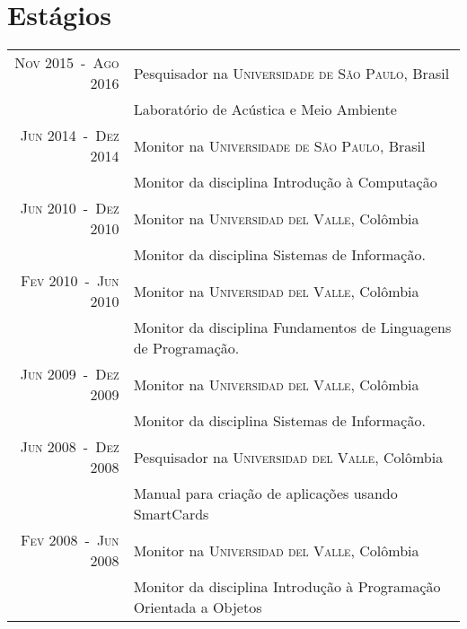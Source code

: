 \documentclass[a4paper,10pt]{article}
\begin{document}
\section{Estágios}
\begin{longtable}{rl}

    \textsc{Nov 2015~-~Ago 2016}  & Pesquisador na \textsc{Universidade de São Paulo}, Brasil \\
                                  &\footnotesize{Laboratório de Acústica e Meio Ambiente} \\

    \textsc{Jun 2014~-~Dez 2014}  & Monitor na \textsc{Universidade de São Paulo}, Brasil \\
                                  &\footnotesize{Monitor da disciplina Introdução à Computação} \\

    \textsc{Jun 2010~-~Dez 2010}  & Monitor na \textsc{Universidad del Valle}, Colômbia \\
                                  &\footnotesize{Monitor da disciplina Sistemas de Informação.} \\

    \textsc{Fev 2010~-~Jun 2010}  & Monitor na \textsc{Universidad del Valle}, Colômbia \\
                                  &\footnotesize{Monitor da disciplina Fundamentos de Linguagens de Programação.} \\

    \textsc{Jun 2009~-~Dez 2009}  & Monitor na \textsc{Universidad del Valle}, Colômbia \\
                                  &\footnotesize{Monitor da disciplina Sistemas de Informação.} \\

    \textsc{Jun 2008~-~Dez 2008}  & Pesquisador na \textsc{Universidad del Valle}, Colômbia \\
                                  &\footnotesize{Manual para criação de aplicações usando SmartCards} \\

    \textsc{Fev 2008~-~Jun 2008}  & Monitor na \textsc{Universidad del Valle}, Colômbia \\
                                  &\footnotesize{Monitor da disciplina Introdução à Programação Orientada a Objetos} \\

\end{longtable}
\end{document}
